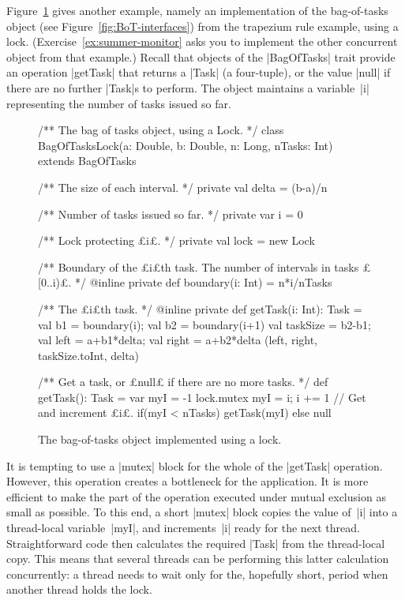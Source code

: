 
Figure~\ref{fig:BagOfTasksLock} gives another example, namely an
implementation of the bag-of-tasks object (see
Figure~\ref{fig:BoT-interfaces}) from the trapezium rule example, using a
lock.  (Exercise~\ref{ex:summer-monitor} asks you to implement the other
concurrent object from that example.)  Recall that objects of the |BagOfTasks|
trait provide an operation |getTask| that returns a |Task| (a four-tuple), or
the value |null| if there are no further |Task|s to perform.  The object
maintains a variable~|i| representing the number of tasks issued so far.


\begin{figure}
\begin{scala}
/** The bag of tasks object, using a Lock. */
class BagOfTasksLock(a: Double, b: Double, n: Long, nTasks: Int)
    extends BagOfTasks{ 
  /** The size of each interval. */
  private val delta = (b-a)/n

  /** Number of tasks issued so far. */
  private var i = 0

  /** Lock protecting £i£. */
  private val lock = new Lock

  /** Boundary of the £i£th task.  The number of intervals in tasks £[0..i)£. */
  @inline private def boundary(i: Int) = n*i/nTasks

  /** The £i£th task. */
  @inline private def getTask(i: Int): Task = {
    val b1 = boundary(i); val b2 = boundary(i+1)
    val taskSize = b2-b1; val left = a+b1*delta; val right = a+b2*delta
    (left, right, taskSize.toInt, delta)
  }

  /** Get a task, or £null£ if there are no more tasks. */
  def getTask(): Task = {
    var myI = -1
    lock.mutex{ myI = i; i += 1} // Get and increment £i£.
    if(myI < nTasks) getTask(myI) else null
  }
}
\end{scala}
\caption{The bag-of-tasks object implemented using a lock.}
\label{fig:BagOfTasksLock}
\end{figure}


It is tempting to use a |mutex| block for the whole of the |getTask|
operation.  However, this operation creates a bottleneck for the application.
It is more efficient to make the part of the operation executed under mutual
exclusion as small as possible.  To this end, a short |mutex| block copies the
value of~|i| into a thread-local variable~|myI|, and increments~|i| ready for
the next thread.  Straightforward code then calculates the required |Task|
from the thread-local copy.  This means that several threads can be performing
this latter calculation concurrently: a thread needs to wait only for the,
hopefully short, period when another thread holds the lock.

